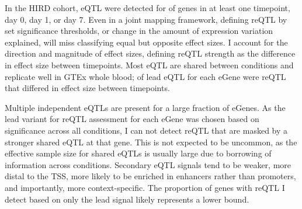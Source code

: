 In the \gls{HIRD} cohort, 
\gls{eQTL} were detected for  of genes in at least one timepoint, day 0, day 1, or day 7.
Even in a joint mapping framework, defining \gls{reQTL} by set significance thresholds, or change in the amount of expression variation explained, will miss classifying equal but opposite effect sizes.
I account for the direction and magnitude of effect sizes, defining reQTL strength as the difference in effect size between timepoints.
Most \gls{eQTL} are shared between conditions and replicate well in GTEx whole blood;
 of lead \gls{eQTL} for each eGene were \gls{reQTL} that differed in effect size between timepoints.

Multiple independent eQTLs are present for a large fraction of eGenes\autocite{zeng2019ComprehensiveMultipleEQTL}.
As the lead variant for reQTL assessment for each eGene was chosen based on significance across all conditions, I can not detect reQTL that are masked by a stronger shared eQTL at that gene.
This is not expected to be uncommon, as the effective sample size for shared eQTLs is usually large due to borrowing of information across conditions.
Secondary \gls{eQTL} signals tend to be weaker, more distal to the TSS, more likely to be enriched in enhancers rather than promoters, and importantly, more context-specific\autocite{vandiedonck2017GeneticAssociationMolecular,dobbyn2018LandscapeConditionalEQTL}.
The proportion of genes with reQTL I detect based on only the lead signal likely represents a lower bound.

